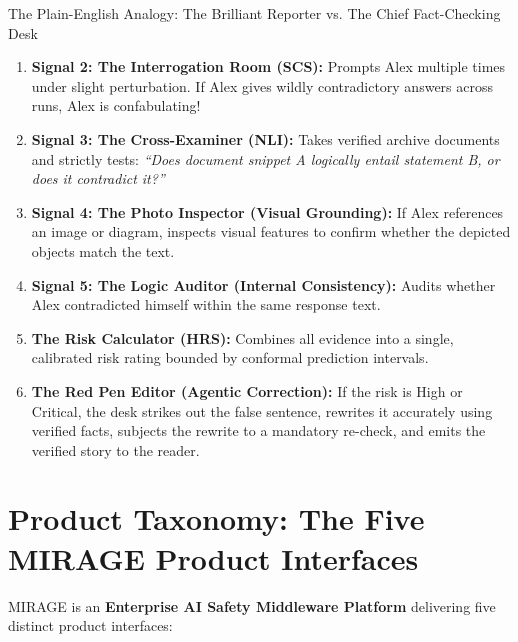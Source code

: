 \documentclass[11pt,a4paper]{article}
\begin{document}
\begin{analogybox}{The Plain-English Analogy: The Brilliant Reporter vs. The Chief Fact-Checking Desk}
\begin{enumerate}[leftmargin=*]
    \item \textbf{Signal 2: The Interrogation Room (SCS):} Prompts Alex multiple times under slight perturbation. If Alex gives wildly contradictory answers across runs, Alex is confabulating!
    \item \textbf{Signal 3: The Cross-Examiner (NLI):} Takes verified archive documents and strictly tests: \textit{``Does document snippet A logically entail statement B, or does it contradict it?''}
    \item \textbf{Signal 4: The Photo Inspector (Visual Grounding):} If Alex references an image or diagram, inspects visual features to confirm whether the depicted objects match the text.
    \item \textbf{Signal 5: The Logic Auditor (Internal Consistency):} Audits whether Alex contradicted himself within the same response text.
    \item \textbf{The Risk Calculator (HRS):} Combines all evidence into a single, calibrated risk rating bounded by conformal prediction intervals.
    \item \textbf{The Red Pen Editor (Agentic Correction):} If the risk is High or Critical, the desk strikes out the false sentence, rewrites it accurately using verified facts, subjects the rewrite to a mandatory re-check, and emits the verified story to the reader.
\end{enumerate}
\end{analogybox}

\section{Product Taxonomy: The Five MIRAGE Product Interfaces}

MIRAGE is an \textbf{Enterprise AI Safety Middleware Platform} delivering five distinct product interfaces:
\end{document}
